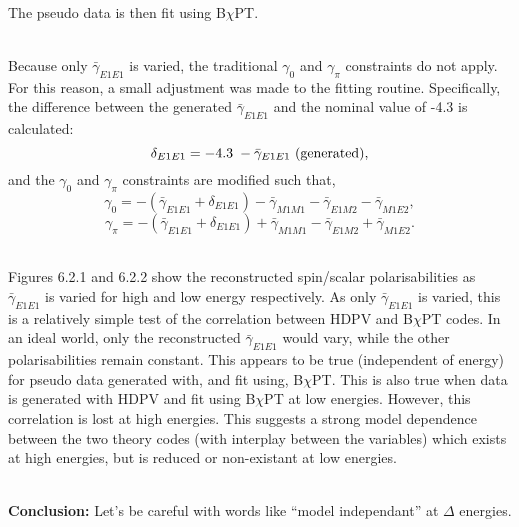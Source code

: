 \documentclass[]{article}
\begin{document}
\noindent \\The pseudo data is then fit using B$\chi$PT. 

\noindent \vspace{5mm}\\Because only $\bar{\gamma}_{E1E1}$ is varied, the traditional $\gamma_{0}$ and $\gamma_{\pi}$ constraints do not apply. For this reason, a small adjustment was made to the fitting routine. Specifically, the difference between the generated $\bar{\gamma}_{E1E1}$ and the nominal value of -4.3 is calculated:
\begin{equation}
\delta_{E1E1} = -4.3 \hspace{1mm} - \bar{\gamma}_{E1E1}\text{ (generated)},
\end{equation}
and the $\gamma_{0}$ and $\gamma_{\pi}$ constraints are modified such that, 
\begin{equation}
\gamma_{0} = -(\bar{\gamma}_{E1E1}+ \delta_{E1E1}) - \bar{\gamma}_{M1M1} - \bar{\gamma}_{E1M2} - \bar{\gamma}_{M1E2}, 
\end{equation}
\begin{equation}
\gamma_{\pi} = -(\bar{\gamma}_{E1E1}+ \delta_{E1E1}) + \bar{\gamma}_{M1M1} - \bar{\gamma}_{E1M2} + \bar{\gamma}_{M1E2}. 
\end{equation}

\noindent \vspace{5mm}\\ Figures 6.2.1 and 6.2.2 show the reconstructed spin/scalar polarisabilities as $\bar{\gamma}_{E1E1}$ is varied for high and low energy respectively. As only $\bar{\gamma}_{E1E1}$ is varied, this is a relatively simple test of the correlation between HDPV and B$\chi$PT codes. In an ideal world, only the reconstructed $\bar{\gamma}_{E1E1}$ would vary, while the other polarisabilities remain constant. This appears to be true (independent of energy) for pseudo data generated with, and fit using, B$\chi$PT. This is also true when data is generated with HDPV and fit using B$\chi$PT at low energies. However, this correlation is lost at high energies. This suggests a strong model dependence between the two theory codes (with interplay between the variables) which exists at high energies, but is reduced or non-existant at low energies.

\noindent \\ \textbf{Conclusion:} Let's be careful with words like \enquote{model independant} at $\Delta$ energies.
\end{document}

